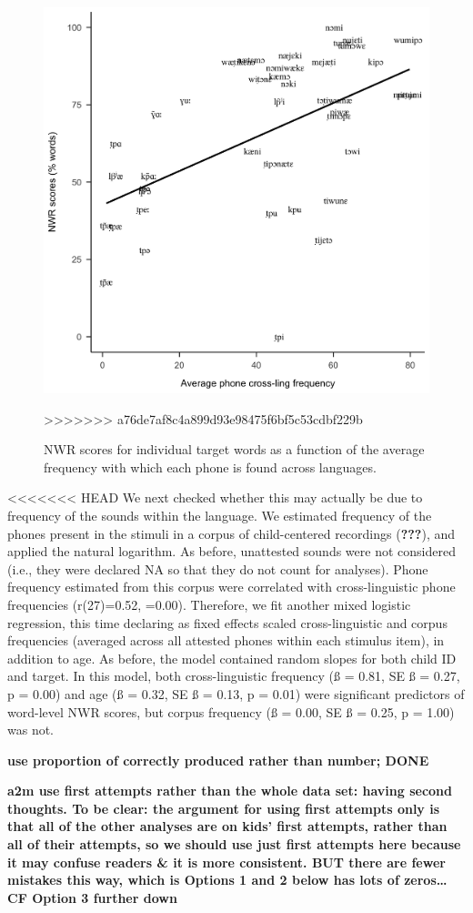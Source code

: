 \documentclass[english,,man,floatsintext]{apa6}
\begin{document}
\begin{figure}[!t]

{\centering \includegraphics[width=0.65\linewidth]{nwr.by.freq.ITEM} 

}
>>>>>>> a76de7af8c4a899d93e98475f6bf5c53cdbf229b

\caption{NWR scores for individual target words as a function of the average frequency with which each phone is found across languages.}\label{fig:Fig2-xling-freq}
\end{figure}

<<<<<<< HEAD
We next checked whether this may actually be due to frequency of the sounds within the language. We estimated frequency of the phones present in the stimuli in a corpus of child-centered recordings ({\textbf{???}}), and applied the natural logarithm. As before, unattested sounds were not considered (i.e., they were declared NA so that they do not count for analyses). Phone frequency estimated from this corpus were correlated with cross-linguistic phone frequencies (r(27)=0.52, =0.00). Therefore, we fit another mixed logistic regression, this time declaring as fixed effects scaled cross-linguistic and corpus frequencies (averaged across all attested phones within each stimulus item), in addition to age. As before, the model contained random slopes for both child ID and target. In this model, both cross-linguistic frequency (ß = 0.81, SE ß = 0.27, p = 0.00) and age (ß = 0.32, SE ß = 0.13, p = 0.01) were significant predictors of word-level NWR scores, but corpus frequency (ß = 0.00, SE ß = 0.25, p = 1.00) was not.

\textbf{use proportion of correctly produced rather than number; DONE}

\textbf{a2m use first attempts rather than the whole data set: having second thoughts. To be clear: the argument for using first attempts only is that all of the other analyses are on kids' first attempts, rather than all of their attempts, so we should use just first attempts here because it may confuse readers \& it is more consistent. BUT there are fewer mistakes this way, which is Options 1 and 2 below has lots of zeros\ldots{} CF Option 3 further down}
\end{document}
